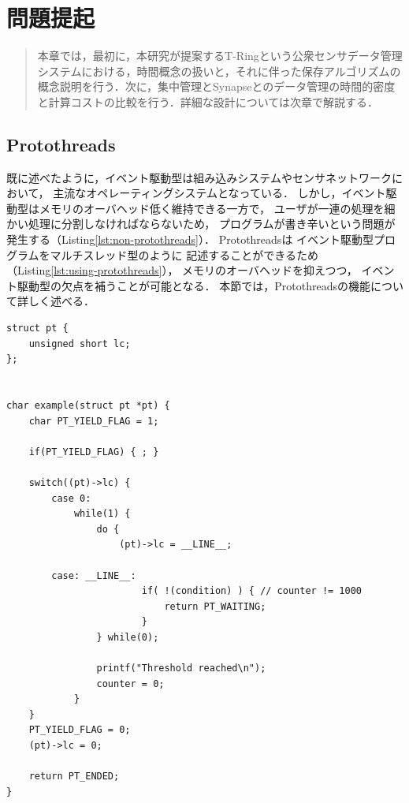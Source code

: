 \chapter{問題提起}
\begin{large}
\begin{quote}
本章では，最初に，本研究が提案するT-Ringという公衆センサデータ管理システムにおける，時間概念の扱いと，それに伴った保存アルゴリズムの概念説明を行う．次に，集中管理とSynapseとのデータ管理の時間的密度と計算コストの比較を行う．詳細な設計については次章で解説する．

\end{quote}
\end{large}
\clearpage

\section{Protothreads}
既に述べたように，イベント駆動型は組み込みシステムやセンサネットワークにおいて，
主流なオペレーティングシステムとなっている．
しかし，イベント駆動型はメモリのオーバヘッド低く維持できる一方で，
ユーザが一連の処理を細かい処理に分割しなければならないため，
プログラムが書き辛いという問題が発生する（Listing\ref{lst:non-protothreads}）．
Protothreads\cite{Dunkels:2006:PSE:1182807.1182811}は
イベント駆動型プログラムをマルチスレッド型のように
記述することができるため（Listing\ref{lst:using-protothreads}），
メモリのオーバヘッドを抑えつつ，
イベント駆動型の欠点を補うことが可能となる．
本節では，Protothreadsの機能について詳しく述べる．



\begin{lstlisting}[caption=Protothredsを使用せずに記述した場合, label={lst:non-protothreads}]
struct pt {
    unsigned short lc;
};


char example(struct pt *pt) { 
    char PT_YIELD_FLAG = 1;

    if(PT_YIELD_FLAG) { ; }

    switch((pt)->lc) {
        case 0:
            while(1) { 
                do {
                    (pt)->lc = __LINE__;

        case: __LINE__:
                        if( !(condition) ) { // counter != 1000
                            return PT_WAITING;
                        } 
                } while(0);

                printf("Threshold reached\n");
                counter = 0;
            } 
    }
    PT_YIELD_FLAG = 0;
    (pt)->lc = 0;

    return PT_ENDED;
}
\end{lstlisting}



